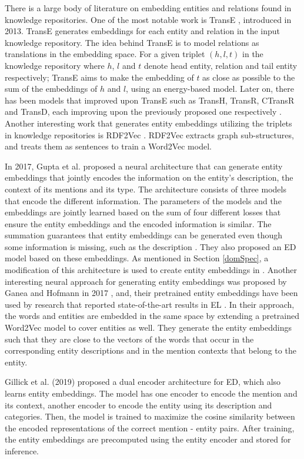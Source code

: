 \documentclass{report}
\theoremstyle{definition}
\theoremstyle{remark}
\begin{document}
There is a large body of literature on embedding entities and relations found in knowledge repositories. One of the most notable work is TransE \cite{TransE}, introduced in 2013. TransE generates embeddings for each entity and relation in the input knowledge repository. The idea behind TransE is to model relations as translations in the embedding space. For a given triplet $(h,l,t)$ in the knowledge repository where $h$, $l$ and $t$ denote head entity, relation and tail entity respectively; TransE aims to make the embedding of $t$ as close as possible to the sum of the embeddings of $h$ and $l$, using an energy-based model. Later on, there has been models that improved upon TransE such as TransH, TransR, CTransR and TransD, each improving upon the previously proposed one respectively  \cite{TransEimproved}. Another interesting work that generates entity embeddings utilizing the triplets in knowledge repositories is RDF2Vec \cite{RDF2Vec}. RDF2Vec extracts graph sub-structures, and treats them as sentences to train a Word2Vec \cite{w2v} model. 
 
In 2017, Gupta et al. \cite{gupta} proposed a neural architecture that can generate entity embeddings that jointly encodes the information on the entity's description, the context of its mentions and its type. The architecture consists of three models that encode the different information. The parameters of the models and the embeddings are jointly learned based on the sum of four different losses that ensure the entity embeddings and the encoded information is similar. The summation guarantees that entity embeddings can be generated even though some information is missing, such as the description \cite{gupta}. They also proposed an ED model based on these embeddings. As mentioned in Section \ref{domSpec}, a modification of this architecture is used to create entity embeddings in \cite{cosmetic}. Another interesting neural approach for generating entity embeddings was proposed by Ganea and Hofmann in 2017 \cite{kolitsasEmbed}, and, their pretrained entity embeddings have been used by research that reported state-of-the-art results in EL \cite{REL, kolitsas}. In their approach, the words and entities are embedded in the same space by extending a pretrained Word2Vec model \cite{w2v} to cover entities as well. They generate the entity embeddings such that they are close to the vectors of the words that occur in the corresponding entity descriptions and in the mention contexts that belong to the entity. 

Gillick et al. (2019) \cite{googleintern} proposed a dual encoder architecture for ED, which also learns entity embeddings. The model has one encoder to encode the mention and its context, another encoder to encode the entity using its description and categories. Then, the model is trained to maximize the cosine similarity between the encoded representations of the correct mention - entity pairs. After training, the entity embeddings are precomputed using the entity encoder and stored for inference. 
\end{document}
